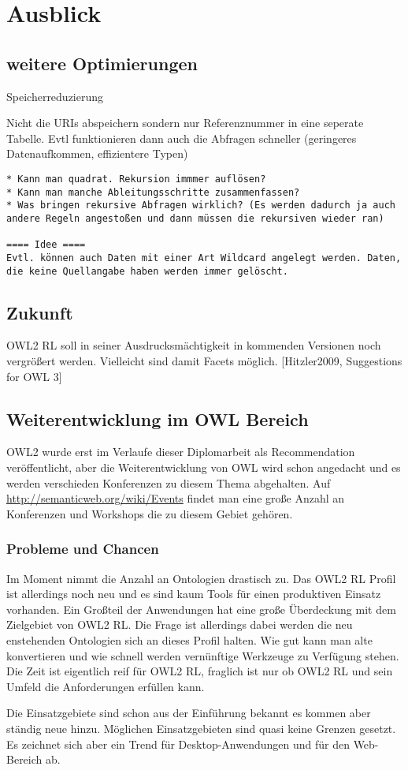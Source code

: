\chapter{Ausblick}
\label{kapitel-ausblick}

\section{weitere Optimierungen}
Speicherreduzierung

Nicht die URIs abspeichern sondern nur Referenznummer in eine seperate Tabelle. Evtl funktionieren dann auch die Abfragen schneller (geringeres Datenaufkommen, effizientere Typen)

\begin{verbatim} 
* Kann man quadrat. Rekursion immmer auflösen?
* Kann man manche Ableitungsschritte zusammenfassen?
* Was bringen rekursive Abfragen wirklich? (Es werden dadurch ja auch andere Regeln angestoßen und dann müssen die rekursiven wieder ran)

==== Idee ====
Evtl. können auch Daten mit einer Art Wildcard angelegt werden. Daten, die keine Quellangabe haben werden immer gelöscht.

\end{verbatim}

\section{Zukunft}
OWL2 RL soll in seiner Ausdrucksmächtigkeit in kommenden Versionen noch vergrößert werden. Vielleicht sind damit Facets möglich. [Hitzler2009, Suggestions for OWL 3]


\section{Weiterentwicklung im OWL Bereich}
OWL2 wurde erst im Verlaufe dieser Diplomarbeit als Recommendation veröffentlicht, aber die Weiterentwicklung von OWL wird schon angedacht \cite{Hitzler2009} und es werden verschieden Konferenzen zu diesem Thema abgehalten. Auf \url{http://semanticweb.org/wiki/Events}
findet man eine große Anzahl an Konferenzen und Workshops die zu diesem Gebiet gehören.

\subsection{Probleme und Chancen}
Im Moment nimmt die Anzahl an Ontologien drastisch zu. Das OWL2 RL Profil ist allerdings noch neu und es sind kaum Tools für einen produktiven Einsatz vorhanden. Ein Großteil der Anwendungen hat eine große Überdeckung mit dem Zielgebiet von OWL2 RL. Die Frage ist allerdings dabei werden die neu enstehenden Ontologien sich an dieses Profil halten. Wie gut kann man alte konvertieren und wie schnell werden vernünftige Werkzeuge zu Verfügung stehen. Die Zeit ist eigentlich reif für OWL2 RL, fraglich ist nur ob OWL2 RL und sein Umfeld die Anforderungen erfüllen kann.

Die Einsatzgebiete sind schon aus der Einführung bekannt es kommen aber ständig neue hinzu. Möglichen Einsatzgebieten sind quasi keine Grenzen gesetzt. Es zeichnet sich aber ein Trend für Desktop-Anwendungen und für den Web-Bereich ab.